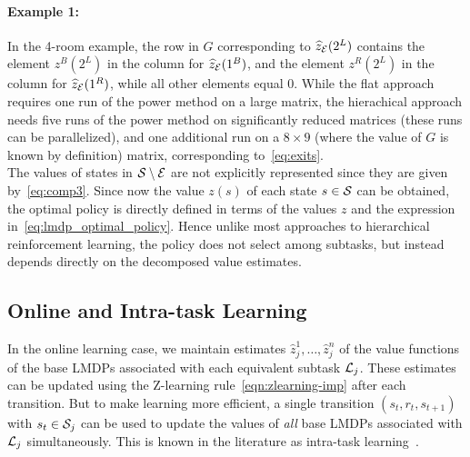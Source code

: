 \paragraph{Example 1:} In the 4-room example, the row in $G$ corresponding to $\widehat{z}_{\mathcal{E}}(2^L)$ contains the element $z^B(2^L)$ in the column for $\widehat{z}_{\mathcal{E}}(1^B)$, and the element $z^R(2^L)$ in the column for $\widehat{z}_{\mathcal{E}}(1^R)$, while all other elements equal $0$. While the flat approach requires one run of the power method on a large matrix, %
the hierachical approach needs five runs of the power method on significantly reduced %
 matrices (these runs can be parallelized), and one additional run on a $8\times 9$ (where the value of $G$ is known by definition) matrix, corresponding to~\eqref{eq:exits}.\\ %

The values of states in $\mathcal{S}\setminus\mathcal{E}$ are not explicitly represented since they are given by~\eqref{eq:comp3}.
Since now the value $z(s)$ of each state $s\in\mathcal{S}$ can be obtained, the optimal policy is directly defined in terms of the values $z$ and the expression in~\eqref{eq:lmdp_optimal_policy}. Hence unlike most approaches to hierarchical reinforcement learning, the policy does not select among subtasks, but instead depends directly on the decomposed value estimates.

\subsection{Online and Intra-task Learning}


In the online learning case, we maintain estimates $\widehat{z}_j^1,\ldots,\widehat{z}_j^n$ of the value functions of the base LMDPs associated with each equivalent subtask $\mathcal{L}_j$. These estimates can be updated using the Z-learning rule~\eqref{eqn:zlearning-imp} after each transition.
But to make learning more efficient, a single transition $(s_t,r_t,s_{t+1})$ with $s_t\in\mathcal{S}_j$ can be used to update the values of {\em all} base LMDPs associated with $\mathcal{L}_j$ simultaneously. This is known in the literature as intra-task learning~\citep{Kaelbling1993,Jonsson2016}.


